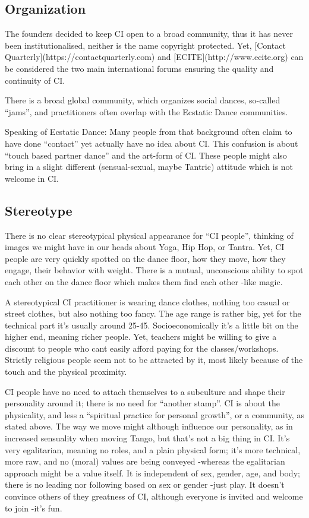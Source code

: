 \subsection{Organization}\label{subsec:organization}

The founders decided to keep CI open to a broad community, thus it has never been institutionalised, neither is the name copyright protected.
Yet, [Contact Quarterly](https://contactquarterly.com) and [ECITE](http://www.ecite.org) can be considered the two main international forums ensuring the quality and continuity of CI.

There is a broad global community, which organizes social dances, so-called ``jams'', and practitioners often overlap with the Ecstatic Dance communities.

Speaking of Ecstatic Dance: Many people from that background often claim to have done ``contact'' yet actually have no idea about CI.
This confusion is about ``touch based partner dance'' and the art-form of CI.
These people might also bring in a slight different (sensual-sexual, maybe Tantric) attitude which is not welcome in CI.

\subsection{Stereotype}\label{subsec:stereotype}

There is no clear stereotypical physical appearance for ``CI people'', thinking of images we might have in our heads about Yoga, Hip Hop, or Tantra.
Yet, CI people are very quickly spotted on the dance floor, how they move, how they engage, their behavior with weight.
There is a mutual, unconscious ability to spot each other on the dance floor which makes them find each other -like magic.

A stereotypical CI practitioner is wearing dance clothes, nothing too casual or street clothes, but also nothing too fancy.
The age range is rather big, yet for the technical part it's usually around 25-45.
Socioeconomically it's a little bit on the higher end, meaning richer people.
Yet, teachers might be willing to give a discount to people who cant easily afford paying for the classes/workshops.
Strictly religious people seem not to be attracted by it, most likely because of the touch and the physical proximity.

CI people have no need to attach themselves to a subculture and shape their personality around it; there is no need for ``another stamp''.
CI is about the physicality, and less a ``spiritual practice for personal growth'', or a community, as stated above.
The way we move might although influence our personality, as in increased sensuality when moving Tango, but that's not a big thing in CI.
It's very egalitarian, meaning no roles, and a plain physical form; it's more technical, more raw, and no (moral) values are being conveyed -whereas the egalitarian approach might be a value itself.
It is independent of sex, gender, age, and body; there is no leading nor following based on sex or gender -just play.
It doesn't convince others of they greatness of CI, although everyone is invited and welcome to join -it's fun.

